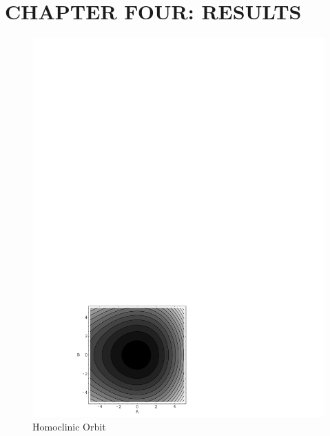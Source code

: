 \chapter{CHAPTER FOUR: RESULTS} \label{chapter_4}


\begin{figure}[!ht] \singlespacing
\begin{center}
\includegraphics[width=.8\textwidth]{figures/homoclinic}  %
\end{center}
\caption{Homoclinic Orbit}\label{tbl:my_first_figure}
\end{figure}

